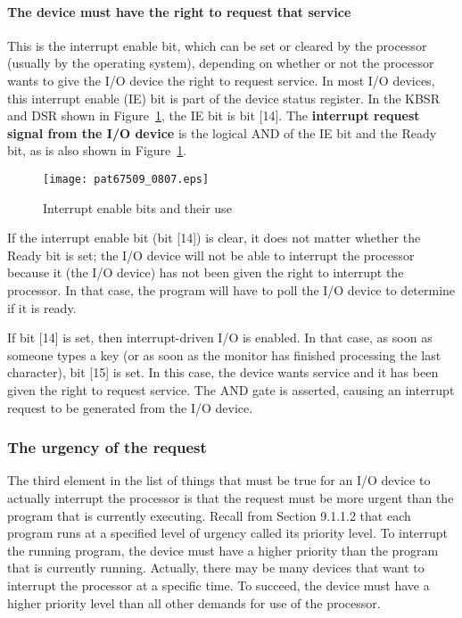 \documentclass{patt}
\begin{document}
\paragraph{The device must have the right to request that service}  This is 
the interrupt enable bit, which can be set or cleared by the processor
(usually by the operating system), depending on whether or not the processor 
wants to give the I/O device the right to request service.  In most
I/O devices, this interrupt enable (IE) bit is part of the device
status register.  In the KBSR and DSR shown in
Figure~\ref{fig:interrupt.enable.bits}, the IE bit is bit [14].
 The {\bf interrupt request signal from the I/O
device} is the logical AND of the IE bit and the Ready bit, as is also
shown in Figure~\ref{fig:interrupt.enable.bits}.

\begin{figure}[h!]
\centerline{\texttt{[image: pat67509\_0807.eps]}}
\caption{Interrupt enable bits and their use}
\label{fig:interrupt.enable.bits}
\end{figure}


If the interrupt enable bit (bit [14]) is clear, it does not matter
whether the Ready bit is set; the I/O device will not be able to
interrupt the processor because it (the I/O device) has not been given
the right to interrupt the processor.  In that case, the program will 
have to poll the I/O device to determine if it is ready.

If bit [14] is set, then interrupt-driven I/O is enabled.  In that
case, as soon as someone types a key (or as soon as the monitor has
finished processing the last character), bit [15] is set.  In this case,
the device wants service and it has been given the right to request service.
The AND gate is asserted, causing an interrupt request to be generated from 
the I/O device.

\FloatBarrier
\subsubsection{The urgency of the request}

The third element in the list of things that must be true for an I/O
device to actually interrupt the processor is that the request must be
more urgent than the program that is currently executing.  Recall from
Section 9.1.1.2 that each program runs at a specified level of urgency called
its priority level.  To interrupt the running program, the device must have a
higher priority than the program that is currently running.  Actually, 
there may be many devices that want to interrupt the processor at a specific 
time.  To succeed, the device must have a higher priority level than all other 
demands for use of the processor.  
\end{document}
